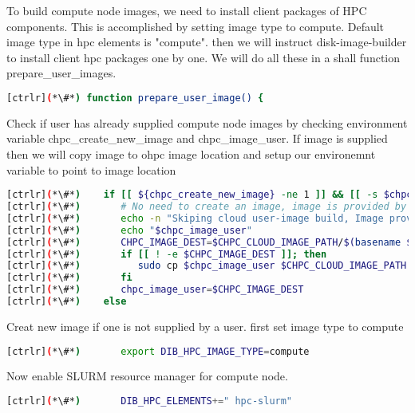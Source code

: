 To build compute node images, we need to install client packages of HPC components. This is accomplished by setting image type to compute. Default image type in hpc elements is "compute". then we will instruct disk-image-builder to install client hpc packages one by one. We will do all these in a shall function prepare\_user\_images.

\begin{lstlisting}[language=bash,keywords={}]
[ctrlr](*\#*) function prepare_user_image() {
\end{lstlisting} 

Check if user has already supplied compute node images by checking environment variable chpc\_create\_new\_image and chpc\_image\_user. If image is supplied then we will copy image to ohpc image location and setup our environemnt variable to point to image location 
\begin{lstlisting}[language=bash,keywords={}]
[ctrlr](*\#*)    if [[ ${chpc_create_new_image} -ne 1 ]] && [[ -s $chpc_image_user ]]; then
[ctrlr](*\#*)       # No need to create an image, image is provided by user
[ctrlr](*\#*)       echo -n "Skiping cloud user-image build, Image provided:"
[ctrlr](*\#*)       echo "$chpc_image_user"
[ctrlr](*\#*)       CHPC_IMAGE_DEST=$CHPC_CLOUD_IMAGE_PATH/$(basename $chpc_image_user)
[ctrlr](*\#*)       if [[ ! -e $CHPC_IMAGE_DEST ]]; then
[ctrlr](*\#*)          sudo cp $chpc_image_user $CHPC_CLOUD_IMAGE_PATH
[ctrlr](*\#*)       fi
[ctrlr](*\#*)       chpc_image_user=$CHPC_IMAGE_DEST
[ctrlr](*\#*)    else
\end{lstlisting} 


Creat new image if one is not supplied by a user. first set image type to compute  

\begin{lstlisting}[language=bash,keywords={}]
[ctrlr](*\#*)       export DIB_HPC_IMAGE_TYPE=compute
\end{lstlisting} 

Now enable SLURM resource manager for compute node.


\begin{lstlisting}[language=bash,keywords={}]
[ctrlr](*\#*)       DIB_HPC_ELEMENTS+=" hpc-slurm"
\end{lstlisting} 


